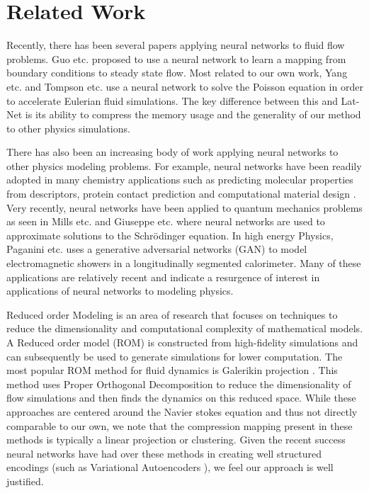 \documentclass{article}
\begin{document}
\section{Related Work}

Recently, there has been several papers applying neural networks to fluid flow problems. Guo etc. \cite{guo2016convolutional} proposed to use a neural network to learn a mapping from boundary conditions to steady state flow. Most related to our own work, Yang etc. \cite{yang2016data} and Tompson etc. \cite{tompson2016accelerating} use a neural network to solve the Poisson equation in order to accelerate Eulerian fluid simulations. The key difference between this and Lat-Net is its ability to compress the memory usage and the generality of our method to other physics simulations.

There has also been an increasing body of work applying neural networks to other physics modeling problems. For example, neural networks have been readily adopted in many chemistry applications such as predicting molecular properties from descriptors, protein contact prediction and computational material design \cite{goh2017deep}. Very recently, neural networks have been applied to quantum mechanics problems as seen in Mills etc. \cite{mills2017deep} and Giuseppe etc. \cite{carleo2017solving} where neural networks are used to approximate solutions to the Schrödinger equation. In high energy Physics, Paganini etc. \cite{2017arXiv170502355P} uses a generative adversarial networks (GAN)\cite{goodfellow2014generative} to model electromagnetic showers in a longitudinally segmented calorimeter. Many of these applications are relatively recent and indicate a resurgence of interest in applications of neural networks to modeling physics.

Reduced order Modeling is an area of research that focuses on techniques to reduce the dimensionality and computational complexity of mathematical models. A Reduced order model (ROM) is constructed from high-fidelity simulations and can subsequently be used to generate simulations for lower computation. The most popular ROM method for fluid dynamics is Galerikin projection \cite{barone2009reduced}. This method uses Proper Orthogonal Decomposition to reduce the dimensionality of flow simulations and then finds the dynamics on this reduced space.  
While these approaches are centered around the Navier stokes equation and thus not directly comparable to our own, we note that the compression mapping present in these methods is typically a linear projection or clustering. Given the recent success neural networks have had over these methods in creating well structured encodings (such as Variational Autoencoders \cite{kingma2013auto} \cite{watter2015embed}), we feel our approach is well justified.
\end{document}
